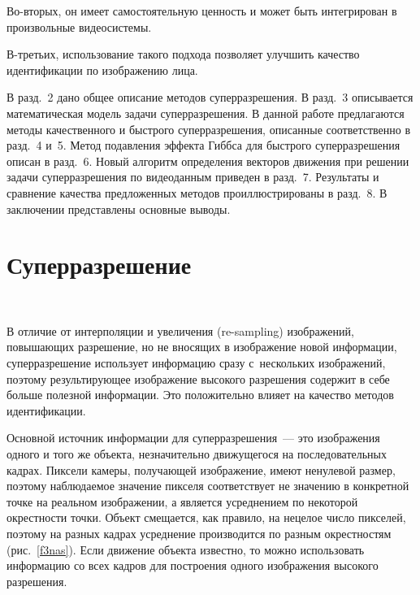 \begin{multicols}{2}


Во-вторых, он имеет самостоятельную ценность и может быть
интегрирован в произвольные видеосистемы. 

В-третьих, использование такого подхода
позволяет улучшить качество идентификации по изоб\-ра\-жению лица.

     В разд.~2 дано общее описание методов суперразрешения. В разд.~3 описывается
математическая модель задачи суперразрешения. В данной работе предлагаются
методы качественного и быстрого суперразрешения, описанные соответственно в
разд.~4 и~5. Метод подавления эффекта Гиббса для быстрого суперразрешения описан
в разд.~6. Новый алгоритм определения векторов движения при решении задачи
суперразрешения по видеоданным приведен в разд.~7. Результаты и сравнение качества
предложенных методов проиллюстрированы в разд.~8. В заключении представлены
основные выводы.

     \section{Суперразрешение}


     \begin{figure*} %
\vspace*{1pt}
\begin{center}
\mbox{%
\epsfxsize=153.319mm
}
\end{center}
\vspace*{-9pt}
      \end{figure*}

     В отличие от интерполяции и увеличения (re-sampling) изображений,
повышающих разрешение, но не вносящих в изображение новой информации,
суперразрешение использует информацию сразу с~нескольких изображений, поэтому
резуль\-ти\-ру\-ющее изображение высокого разрешения содержит в себе больше полезной
информации. Это поло\-жительно влияет на качество методов идентификации.

     Основной источник информации для суперразрешения~--- это изображения
одного и того же объекта, незначительно движущегося на последовательных кадрах.
Пиксели камеры, получающей изоб\-ра\-же\-ние, имеют ненулевой размер, поэтому
наблюдаемое значение пикселя соответствует не значению в конкретной точке на
реальном изоб\-ра\-же\-нии, а является усреднением по некоторой окрестности точки.
Объект смещается, как правило, на нецелое число пикселей, поэтому на разных кадрах
усреднение производится по разным окрестностям (рис.~\ref{f3nas}). Если
движение объекта известно, то можно использовать информацию со всех кад\-ров для
построения одного изображения высокого разрешения.



\end{multicols}

